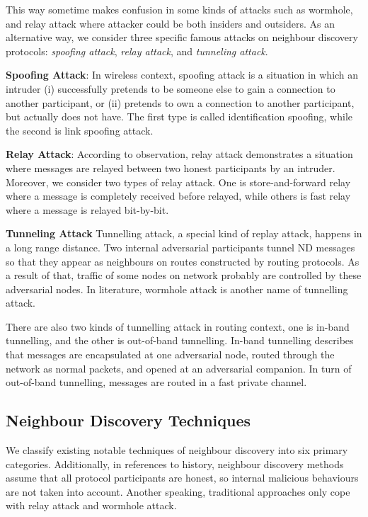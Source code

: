 This way sometime makes confusion in some kinds of attacks such as wormhole, and relay attack where attacker could be both insiders and outsiders. As an alternative way, we consider three specific famous attacks on neighbour discovery protocols: \emph{spoofing attack}, \emph{relay attack}, and \emph{tunneling attack}.

\textbf{Spoofing Attack}: In wireless context, spoofing attack is a situation in which an intruder (i) successfully pretends to be someone else to gain a connection to another participant, or (ii) pretends to own a connection to another participant, but actually does not have. The first type is called identification spoofing, while the second is link spoofing attack. 

\textbf{Relay Attack}: According to observation, relay attack demonstrates a situation where messages are relayed between two honest participants by an intruder. Moreover, we consider two types of relay attack. One is store-and-forward relay where a message is completely received before relayed, while others is fast relay where a message is relayed bit-by-bit. 

\textbf{Tunneling Attack} Tunnelling attack, a special kind of replay attack, happens in a long range distance. Two internal adversarial participants tunnel ND messages so that they appear as neighbours on routes constructed by routing protocols. As a result of that, traffic of some nodes on network probably are controlled by these adversarial nodes. In literature, wormhole attack is another name of tunnelling attack. 

There are also two kinds of tunnelling attack in routing context, one is in-band tunnelling, and the other is out-of-band tunnelling. In-band tunnelling describes that messages are encapsulated at one adversarial node, routed through the network as normal packets, and opened at an adversarial companion. In turn of out-of-band tunnelling, messages are routed in a fast private channel.

\subsection{Neighbour Discovery Techniques}

We classify existing notable techniques of neighbour discovery into six primary categories. Additionally, in references to history, neighbour discovery methods assume that all protocol participants are honest, so internal malicious behaviours are not taken into account. Another speaking, traditional approaches only cope with relay attack and wormhole attack. 

